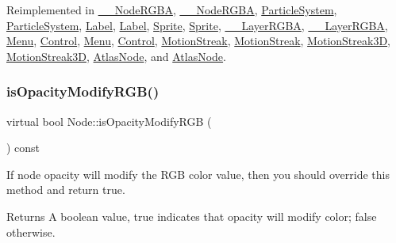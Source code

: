 Reimplemented in \hyperlink{class____NodeRGBA_a60d28606b0a253ad511df43a868fa08c}{\+\_\+\+\_\+\+Node\+R\+G\+BA}, \hyperlink{class____NodeRGBA_a60d28606b0a253ad511df43a868fa08c}{\+\_\+\+\_\+\+Node\+R\+G\+BA}, \hyperlink{classParticleSystem_a36df0682b59803de36c914ce2bffe47d}{Particle\+System}, \hyperlink{classParticleSystem_a36df0682b59803de36c914ce2bffe47d}{Particle\+System}, \hyperlink{classLabel_ade8bf273e99add4d4861697d469f6d89}{Label}, \hyperlink{classLabel_ade8bf273e99add4d4861697d469f6d89}{Label}, \hyperlink{classSprite_af25cfe5f1f6178f5a13db86a258848d0}{Sprite}, \hyperlink{classSprite_a00d162b3e55fc5acd56e5c3e48bc0a97}{Sprite}, \hyperlink{class____LayerRGBA_a014dba2472f2708ad4493e97ca5999b0}{\+\_\+\+\_\+\+Layer\+R\+G\+BA}, \hyperlink{class____LayerRGBA_a014dba2472f2708ad4493e97ca5999b0}{\+\_\+\+\_\+\+Layer\+R\+G\+BA}, \hyperlink{classMenu_a94211ecf8dd3edeed2e5d54f63ae90b9}{Menu}, \hyperlink{classControl_ac49bc0859aade4ad1ab6311941b4207a}{Control}, \hyperlink{classMenu_ae173fda432df51ec761c8ef5d96ea59a}{Menu}, \hyperlink{classControl_af7a191cace0c56d1dae182716c0e8150}{Control}, \hyperlink{classMotionStreak_a74c2b98555067ccd7d069273f9569aba}{Motion\+Streak}, \hyperlink{classMotionStreak_a9cadee9d318c3bbc1e299563e0ce8d97}{Motion\+Streak}, \hyperlink{classMotionStreak3D_a5de4e2e686f06acfecf86fc7b7caed6e}{Motion\+Streak3D}, \hyperlink{classMotionStreak3D_a6b513fcdb7b462e2a28bb67e3dd35836}{Motion\+Streak3D}, \hyperlink{classAtlasNode_ad7d0c0a791719739d15e4f07c75f6704}{Atlas\+Node}, and \hyperlink{classAtlasNode_a3aa161e8abaff7422b7f9ef895f9439d}{Atlas\+Node}.

\mbox{\label{classNode_af7bb22bd30b2ab6f1534518db6895b87}} 
\subsubsection{\texorpdfstring{is\+Opacity\+Modify\+R\+G\+B()}{isOpacityModifyRGB()}\hspace{0.1cm}{\footnotesize\ttfamily [2/2]}}
{\footnotesize\ttfamily virtual bool Node\+::is\+Opacity\+Modify\+R\+GB (\begin{DoxyParamCaption}{ }\end{DoxyParamCaption}) const\hspace{0.3cm}{\ttfamily [virtual]}}

If node opacity will modify the R\+GB color value, then you should override this method and return true. \begin{DoxyReturn}{Returns}
A boolean value, true indicates that opacity will modify color; false otherwise. 
\end{DoxyReturn}


